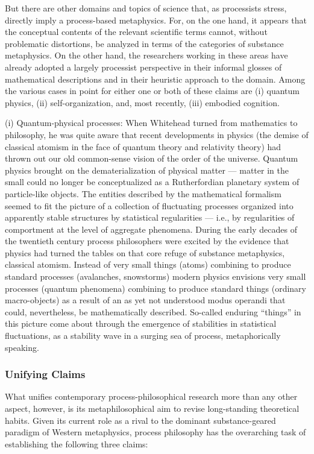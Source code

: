 But there are other domains and topics of science that, as processists stress, directly imply a process-based metaphysics. For, on the one hand, it appears that the conceptual contents of the relevant scientific terms cannot, without problematic distortions, be analyzed in terms of the categories of substance metaphysics. On the other hand, the researchers working in these areas have already adopted a largely processist perspective in their informal glosses of mathematical descriptions and in their heuristic approach to the domain. Among the various cases in point for either one or both of these claims are (i) quantum physics, (ii) self-organization, and, most recently, (iii) embodied cognition.

(i) Quantum-physical processes: When Whitehead turned from mathematics to philosophy, he was quite aware that recent developments in physics (the demise of classical atomism in the face of quantum theory and relativity theory) had thrown out our old common-sense vision of the order of the universe. Quantum physics brought on the dematerialization of physical matter — matter in the small could no longer be conceptualized as a Rutherfordian planetary system of particle-like objects. The entities described by the mathematical formalism seemed to fit the picture of a collection of fluctuating processes organized into apparently stable structures by statistical regularities — i.e., by regularities of comportment at the level of aggregate phenomena. During the early decades of the twentieth century process philosophers were excited by the evidence that physics had turned the tables on that core refuge of substance metaphysics, classical atomism. Instead of very small things (atoms) combining to produce standard processes (avalanches, snowstorms) modern physics envisions very small processes (quantum phenomena) combining to produce standard things (ordinary macro-objects) as a result of an as yet not understood modus operandi that could, nevertheless, be mathematically described. So-called enduring “things” in this picture come about through the emergence of stabilities in statistical fluctuations, as a stability wave in a surging sea of process, metaphorically speaking.
\subsubsection{Unifying Claims}

What unifies contemporary process-philosophical research more than any other aspect, however, is its metaphilosophical aim to revise long-standing theoretical habits. Given its current role as a rival to the dominant substance-geared paradigm of Western metaphysics, process philosophy has the overarching task of establishing the following three claims:

